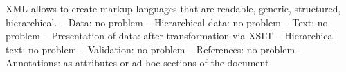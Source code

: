 
XML allows to create markup languages that are
readable, generic, structured, hierarchical.
– Data: no problem
– Hierarchical data: no problem
– Text: no problem
– Presentation of data: after transformation via XSLT
– Hierarchical text: no problem
– Validation: no problem
– References: no problem
– Annotations: as attributes or ad hoc sections of the
document 